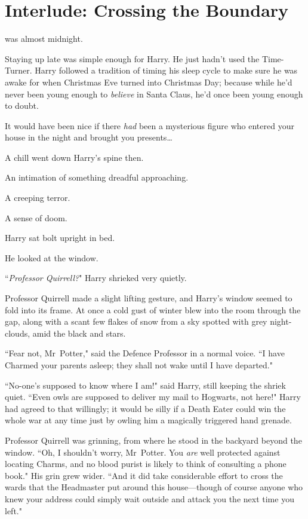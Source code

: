 \chapter{Interlude: Crossing the Boundary}

 was almost midnight.

\hplettrineextrapara
Staying up late was simple enough for Harry. He just hadn't used the Time-Turner. Harry followed a tradition of timing his sleep cycle to make sure he was awake for when Christmas Eve turned into Christmas Day; because while he'd never been young enough to \emph{believe} in Santa Claus, he'd once been young enough to doubt.

It would have been nice if there \emph{had} been a mysterious figure who entered your house in the night and brought you presents…

A chill went down Harry's spine then.

An intimation of something dreadful approaching.

A creeping terror.

A sense of doom.

Harry sat bolt upright in bed.

He looked at the window.

``\emph{Professor Quirrell?}" Harry shrieked very quietly.

Professor Quirrell made a slight lifting gesture, and Harry's window seemed to fold into its frame. At once a cold gust of winter blew into the room through the gap, along with a scant few flakes of snow from a sky spotted with grey night-clouds, amid the black and stars.

``Fear not, Mr~Potter," said the Defence Professor in a normal voice. ``I have Charmed your parents asleep; they shall not wake until I have departed."

``No-one's supposed to know where I am!" said Harry, still keeping the shriek quiet. ``Even owls are supposed to deliver my mail to Hogwarts, not here!" Harry had agreed to that willingly; it would be silly if a Death Eater could win the whole war at any time just by owling him a magically triggered hand grenade.

Professor Quirrell was grinning, from where he stood in the backyard beyond the window. ``Oh, I shouldn't worry, Mr~Potter. You \emph{are} well protected against locating Charms, and no blood purist is likely to think of consulting a phone book." His grin grew wider. ``And it did take considerable effort to cross the wards that the Headmaster put around this house—though of course anyone who knew your address could simply wait outside and attack you the next time you left."

